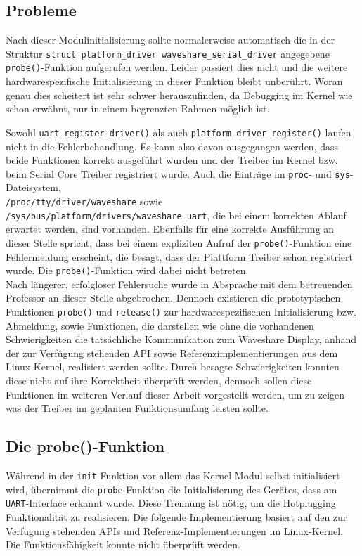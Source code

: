 \subsection{Probleme}
Nach dieser Modulinitialisierung sollte normalerweise automatisch die in der Struktur \texttt{struct platform_driver waveshare_serial_driver} angegebene \texttt{probe()}-Funktion aufgerufen werden. Leider passiert dies nicht und die weitere hardwarespezifische Initialisierung in dieser Funktion bleibt unberührt. Woran genau dies scheitert ist sehr schwer herauszufinden, da Debugging im Kernel wie schon erwähnt, nur in einem begrenzten Rahmen möglich ist.

Sowohl \texttt{uart_register_driver()} als auch \texttt{platform_driver_register()} laufen nicht in die Fehlerbehandlung. Es kann also davon ausgegangen werden, dass beide Funktionen korrekt ausgeführt wurden und der Treiber im Kernel bzw. beim Serial Core Treiber registriert wurde. Auch die Einträge im \texttt{proc}- und \texttt{sys}-Dateisystem, \\ 
\texttt{/proc/tty/driver/waveshare} sowie \texttt{/sys/bus/platform/drivers/waveshare\_uart}, die bei einem korrekten Ablauf erwartet werden, sind vorhanden. Ebenfalls für eine korrekte Ausführung an dieser Stelle spricht, dass bei einem expliziten Aufruf der \texttt{probe()}-Funktion eine Fehlermeldung erscheint, die besagt, dass der Plattform Treiber schon registriert wurde. Die \texttt{probe()}-Funktion wird dabei nicht betreten. \\ %

Nach längerer, erfolgloser Fehlersuche wurde in Absprache mit dem betreuenden Professor an dieser Stelle abgebrochen. Dennoch existieren die prototypischen Funktionen \texttt{probe()} und \texttt{release()} zur hardwarespezifischen Initialisierung bzw. Abmeldung, sowie Funktionen, die darstellen wie ohne die vorhandenen Schwierigkeiten die tatsächliche Kommunikation zum Waveshare Display, anhand der zur Verfügung stehenden API sowie Referenzimplementierungen aus dem Linux Kernel, realisiert werden sollte. Durch besagte Schwierigkeiten konnten diese nicht auf ihre Korrektheit überprüft werden, dennoch sollen diese Funktionen im weiteren Verlauf dieser Arbeit vorgestellt werden, um zu zeigen was der Treiber im geplanten Funktionsumfang leisten sollte.


\subsection{Die probe()-Funktion} %
Während in der \texttt{init}-Funktion vor allem das Kernel Modul selbst initialisiert wird, übernimmt die \texttt{probe}-Funktion die Initialisierung des Gerätes, dass am \texttt{UART}-Interface erkannt wurde. Diese Trennung ist nötig, um die Hotplugging Funktionalität zu realisieren. Die folgende Implementierung basiert auf den zur Verfügung stehenden APIs und Referenz-Implementierungen im Linux-Kernel. Die Funktionsfähigkeit konnte nicht überprüft werden. \\

